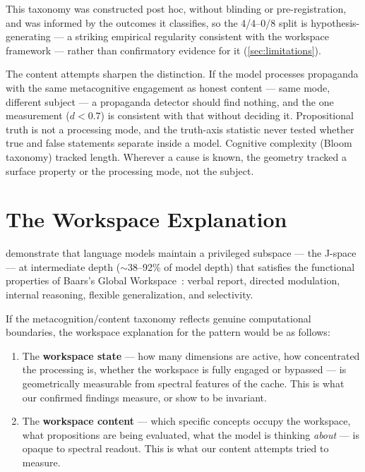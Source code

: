 \documentclass[11pt,a4paper]{article}
\begin{document}
This taxonomy was constructed post hoc, without blinding or
pre-registration, and was informed by the outcomes it classifies, so
the 4/4--0/8 split is hypothesis-generating --- a striking empirical
regularity consistent with the workspace framework --- rather than
confirmatory evidence for it (\cref{sec:limitations}).

The content attempts sharpen the distinction. If the model processes
propaganda with the same metacognitive engagement as honest content ---
same mode, different subject --- a propaganda detector should find
nothing, and the one measurement ($d{<}0.7$) is consistent with that
without deciding it. Propositional truth is not a processing mode, and
the truth-axis statistic never tested whether true and false
statements separate inside a model. Cognitive complexity (Bloom
taxonomy) tracked length. Wherever a cause is known, the geometry
tracked a surface property or the processing mode, not the subject.

\section{The Workspace Explanation}
\label{sec:workspace}

\citet{gurnee2026gwt} demonstrate that language models
maintain a privileged subspace --- the J-space --- at intermediate
depth ($\sim$38--92\% of model depth) that satisfies the functional
properties of Baars's Global Workspace~\citep{baars1988cognitive}:
verbal report, directed modulation, internal reasoning, flexible
generalization, and selectivity.

If the metacognition/content taxonomy reflects genuine computational
boundaries, the workspace explanation for the pattern would be as
follows:

\begin{enumerate}[nosep]
\item The \textbf{workspace state} --- how many dimensions are active,
  how concentrated the processing is, whether the workspace is fully
  engaged or bypassed --- is geometrically measurable from spectral
  features of the cache. This is what our confirmed findings measure,
  or show to be invariant.
\item The \textbf{workspace content} --- which specific concepts occupy
  the workspace, what propositions are being evaluated, what the model
  is thinking \emph{about} --- is opaque to spectral readout. This is
  what our content attempts tried to measure.
\end{enumerate}
\end{document}
